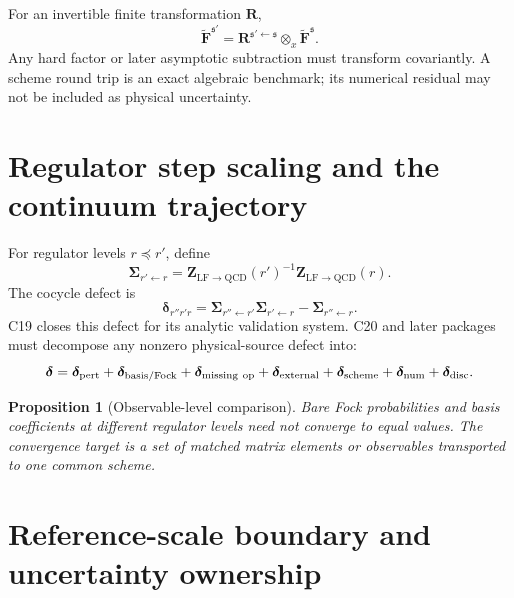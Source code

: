\documentclass[11pt]{article}
\newtheorem{proposition}[definition]{Proposition}
\newcommand{\LF}{\mathrm{LF}}
\newcommand{\QCD}{\mathrm{QCD}}
\newcommand{\otimesx}{\mathbin{\otimes_x}}
\begin{document}
For an invertible finite transformation \(\bm R\),
\begin{equation}
 \widetilde{\bm F}^{\mathfrak s'}
 =
 \bm R^{\mathfrak s'\leftarrow\mathfrak s}
 \otimesx
 \widetilde{\bm F}^{\mathfrak s}.
 \label{eq:finite-scheme}
\end{equation}
Any hard factor or later asymptotic subtraction must transform covariantly.  A scheme round trip is an exact algebraic benchmark; its numerical residual may not be included as physical uncertainty.

\section{Regulator step scaling and the continuum trajectory}
\label{sec:step-scaling}

For regulator levels \(r\preceq r'\), define
\begin{equation}
 \bm\Sigma_{r'\leftarrow r}
 =
 \bm Z_{\LF\to\QCD}(r')^{-1}
 \bm Z_{\LF\to\QCD}(r).
 \label{eq:step-scaling}
\end{equation}
The cocycle defect is
\begin{equation}
 \bm\delta_{r''r'r}
 =
 \bm\Sigma_{r''\leftarrow r'}
 \bm\Sigma_{r'\leftarrow r}
 -
 \bm\Sigma_{r''\leftarrow r}.
 \label{eq:cocycle-defect}
\end{equation}
C19 closes this defect for its analytic validation system.  C20 and later packages must decompose any nonzero physical-source defect into:
\begin{equation}
 \bm\delta=
 \bm\delta_{\rm pert}
 +\bm\delta_{\rm basis/Fock}
 +\bm\delta_{\rm missing\ op}
 +\bm\delta_{\rm external}
 +\bm\delta_{\rm scheme}
 +\bm\delta_{\rm num}
 +\bm\delta_{\rm disc}.
 \label{eq:cocycle-decomposition}
\end{equation}

\begin{proposition}[Observable-level comparison]
Bare Fock probabilities and basis coefficients at different regulator levels need not converge to equal values.  The convergence target is a set of matched matrix elements or observables transported to one common scheme.
\end{proposition}

\section{Reference-scale boundary and uncertainty ownership}
\label{sec:reference-boundary}
\end{document}
